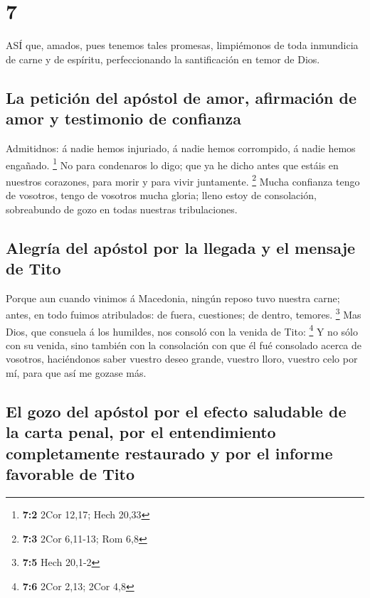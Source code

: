 \hypertarget{section-6}{%
\section{7}\label{section-6}}

 ASÍ que, amados, pues tenemos tales promesas, limpiémonos
de toda inmundicia de carne y de espíritu, perfeccionando la
santificación en temor de Dios.

\hypertarget{la-peticiuxf3n-del-apuxf3stol-de-amor-afirmaciuxf3n-de-amor-y-testimonio-de-confianza}{%
\subsection{La petición del apóstol de amor, afirmación de amor y
testimonio de
confianza}\label{la-peticiuxf3n-del-apuxf3stol-de-amor-afirmaciuxf3n-de-amor-y-testimonio-de-confianza}}

 Admitidnos: á nadie hemos injuriado, á nadie hemos
corrompido, á nadie hemos engañado. \footnote{\textbf{7:2} 2Cor 12,17;
  Hech 20,33}  No para condenaros lo digo; que ya he dicho
antes que estáis en nuestros corazones, para morir y para vivir
juntamente. \footnote{\textbf{7:3} 2Cor 6,11-13; Rom 6,8} 
Mucha confianza tengo de vosotros, tengo de vosotros mucha gloria; lleno
estoy de consolación, sobreabundo de gozo en todas nuestras
tribulaciones.

\hypertarget{alegruxeda-del-apuxf3stol-por-la-llegada-y-el-mensaje-de-tito}{%
\subsection{Alegría del apóstol por la llegada y el mensaje de
Tito}\label{alegruxeda-del-apuxf3stol-por-la-llegada-y-el-mensaje-de-tito}}

 Porque aun cuando vinimos á Macedonia, ningún reposo tuvo
nuestra carne; antes, en todo fuimos atribulados: de fuera, cuestiones;
de dentro, temores. \footnote{\textbf{7:5} Hech 20,1-2}  Mas
Dios, que consuela á los humildes, nos consoló con la venida de Tito:
\footnote{\textbf{7:6} 2Cor 2,13; 2Cor 4,8}  Y no sólo con
su venida, sino también con la consolación con que él fué consolado
acerca de vosotros, haciéndonos saber vuestro deseo grande, vuestro
lloro, vuestro celo por mí, para que así me gozase más.

\hypertarget{el-gozo-del-apuxf3stol-por-el-efecto-saludable-de-la-carta-penal-por-el-entendimiento-completamente-restaurado-y-por-el-informe-favorable-de-tito}{%
\subsection{El gozo del apóstol por el efecto saludable de la carta
penal, por el entendimiento completamente restaurado y por el informe
favorable de
Tito}\label{el-gozo-del-apuxf3stol-por-el-efecto-saludable-de-la-carta-penal-por-el-entendimiento-completamente-restaurado-y-por-el-informe-favorable-de-tito}}

